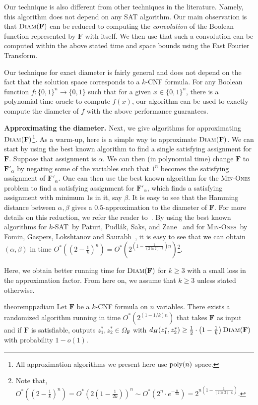 \documentclass[11pt, letterpaper]{article}
\theoremstyle{definition}
\newcommand{\f}{\mathbf{F}}
\newcommand{\Om}{\Omega_{\f}}
\newcommand{\minones}{\textsc{Min-Ones}\xspace}
\newcommand{\D}{\textsc{Diam}}
\newcommand{\poly}{\mbox{\rm poly}}
\begin{document}
Our technique is also different from other techniques in the literature. Namely, this algorithm does not depend on any SAT algorithm. Our main observation is that $\D(\f)$ can be reduced to computing the \emph{convolution} of the Boolean function represented by $\f$ with itself. We then use that such a convolution can be computed within the above stated time and space bounds using the Fast Fourier Transform. 

Our technique for exact diameter is fairly general and does not depend on the fact that the solution space corresponds to a $k$-CNF formula. For any Boolean function $f: \{0,1\}^n \rightarrow \{0,1\}$ such that for a given $x \in \{0,1\}^n$, there is a polynomial time oracle to compute $f(x)$, our algorithm can be used to exactly compute the diameter of $f$ with the above performance guarantees. 

\medskip\noindent
\textbf{Approximating the diameter.} Next, we give algorithms for approximating $\D(\f)$\footnote{All approximation algorithms we present here use $\poly(n)$ space.}. As a warm-up, here is a simple way to approximate $\D(\f)$. We can start by using the best known algorithm to find a single satisfying assignment for $\f$. Suppose that assignment is $\alpha$. We can then (in polynomial time) change $\f$ to $\f'_\alpha$ by negating some of the variables such that $1^n$ becomes the satisfying assignment of $\f'_\alpha$. 
One can then use the best known algorithm for the \minones problem to find a satisfying assignment for $\f'_\alpha$, which finds a satisfying assignment with minimum $1$s in it, say $\beta$. It is easy to see that the Hamming distance between $\alpha, \beta$ gives a $0.5$-approximation to the diameter of $\f$. For more details on this reduction, we refer the reader to~. By using the best known algorithms for $k$-SAT~by Paturi, Pudl\'ak, Saks, and Zane~\cite{paturi2005} and for \minones~by Fomin, Gaspers, Lokshtanov and Saurabh~\cite{ConicSearch}, it is easy to see that we can obtain $(\alpha, \beta)$ in time $O^*((2-\frac{1}{k})^{n})=O^*\left(2^{ (1-\frac{1}{(2 \ln 2) \cdot k})n}\right)$\footnote{Note that, $ O^*((2-\frac{1}{k})^{n}) = O^*(2(1-\frac{1}{2k}))^{n} \sim O^*(2^n \cdot e^{-\frac{n}{2k}}) = 2^{n (1-\frac{1}{(2 \ln 2) \cdot k})}$.}.

Here, we obtain better running time for $\D(\f)$ for $k\geq 3$ with a small loss in the approximation factor. From here on, we assume that $k \geq 3$ unless stated otherwise.

\begin{restatable}[PPZ approximating $\D(\f)$]{theorem}{ppzdiam}
    \label{thm:ppz-for-dia}
    Let $\f$ be a $k$-CNF formula on $n$ variables. There exists a randomized algorithm running in time $O^*\left(2^{(1-1/k)n}\right)$ that takes $\f$ as input and if $\f$ is satisfiable, outputs $z_1^*, z_2^* \in \Om$ with $d_H(z_1^*, z_2^*) \geq \frac{1}{2}\cdot\left(1-\frac{1}{k}\right) \D(\f)$ with probability $1-o(1)$.
\end{restatable}
\end{document}
